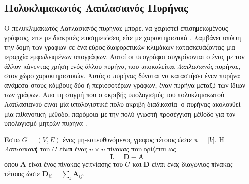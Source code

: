 \subsection{Πολυκλιμακωτός Λαπλασιανός Πυρήνας}
\label{ssec:ml}
Ο πολυκλιμακωτός Λαπλασιανός πυρήνας μπορεί να χειριστεί επισημειωμένους γράφους, είτε με διακριτές επισημειώσεις είτε με χαρακτηριστικά \cite{kondor2016multiscale}.
Λαμβάνει υπόψη την δομή των γράφων σε ένα εύρος διαφορετικών κλιμάκων κατασκευάζοντας μία ιεραρχία εμφωλευμένων υπογράφων.
Αυτοί οι υπογράφοι συγκρίνονται ο ένας με τον άλλον κάνοντας χρήση ενός άλλου πυρήνα, που αποκαλείται \textit{Λαπλασιανός} πυρήνας, στον χώρο χαρακτηριστικών.
Αυτός ο πυρήνας δύναται να καταστήσει έναν πυρήνα ανάμεσα στους κόμβους δύο ή περισσοτέρων γράφων, έναν πυρήνα μεταξύ των ίδιων των γράφων.
Από τη στιγμή που ο ακριβής υπολογισμός του πολυκλιμακωτού Λαπλασιανού είναι μία υπολογιστικά πολύ ακριβή διαδικασία, ο πυρήνας ακολουθεί μία πιθανοτική μέθοδο, παρόμοια με την πολύ γνωστή προσέγγιση μέθοδο  για τον υπολογισμό μητρών πυρήνα \cite{williams2001using}.

Έστω $G=(V,E)$ ένας μη-κατευθυνόμενος γράφος τέτοιος ώστε $n = |V|$.
Η \textit{Λαπλασιανή} του $G$ είναι ένας $n \times n$ πίνακας που ορίζεται ως
\begin{equation}
    \mathbf{L} = \mathbf{D} - \mathbf{A} 
\end{equation}
όπου $\mathbf{A}$ είναι ένας πίνακας γειτνίασης του $G$ και $\mathbf{D}$ είναι ένας διαγώνιος πίνακας τέτοιος ώστε $\mathbf{D}_{ii} = \sum_j \mathbf{A}_{ij}$.


